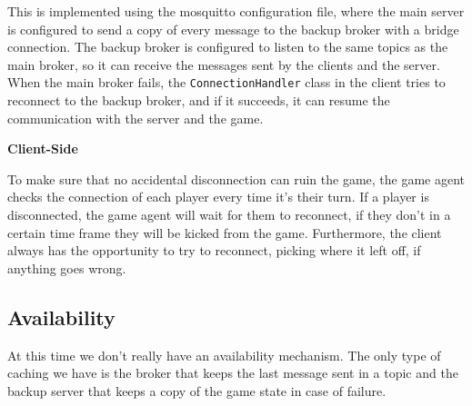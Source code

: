 \documentclass{scrartcl}
\begin{document}
\begin{itemize}
\begin{itemize}
    This is implemented using the mosquitto configuration file, where the main server is configured to send a copy of every message to the backup broker with a bridge connection. \newline
    The backup broker is configured to listen to the same topics as the main broker, so it can receive the messages sent by the clients and the server. \newline
    When the main broker fails, the \texttt{ConnectionHandler} class in the client tries to reconnect to the backup broker, and if it succeeds, it can resume the communication with the server and the game. \newline
  \end{itemize}
  \textbf{Client-Side} \par
  To make sure that no accidental disconnection can ruin the game, the game agent checks the connection
  of each player every time it's their turn. If a player is disconnected, the game agent will wait for
  them to reconnect, if they don't in a certain time frame they will be kicked from the game. \newline
  Furthermore, the client always has the opportunity to try to reconnect, picking where it left
  off, if anything goes wrong.
\end{itemize}

\subsection{Availability}\label{availability}



At this time we don't really have an availability mechanism. \newline
The only type of caching we have is the broker that keeps the last message sent in a topic
and the backup server that keeps a copy of the game state in case of failure.
\end{document}
